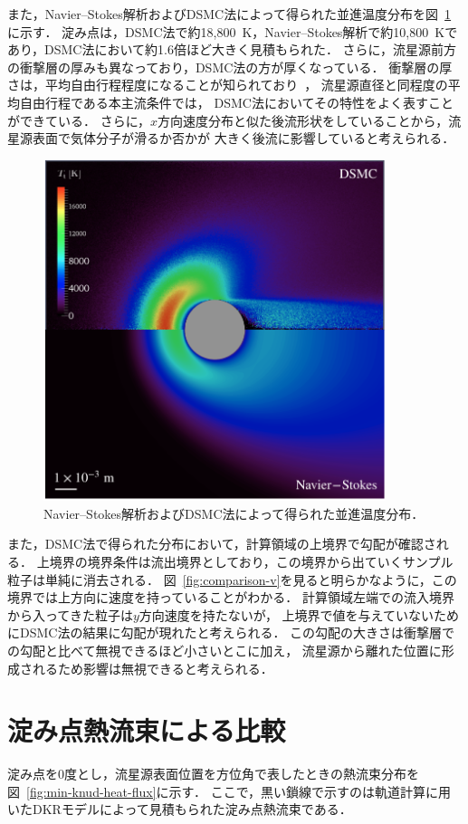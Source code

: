 また，Navier–Stokes解析およびDSMC法によって得られた並進温度分布を図~\ref{fig:comparison-tt}に示す．
淀み点は，DSMC法で約18,800~K，Navier–Stokes解析で約10,800~Kであり，DSMC法において約1.6倍ほど大きく見積もられた．
さらに，流星源前方の衝撃層の厚みも異なっており，DSMC法の方が厚くなっている．
衝撃層の厚さは，平均自由行程程度になることが知られており~\cite{maruzen圧縮性流体}，
流星源直径と同程度の平均自由行程である本主流条件では，
DSMC法においてその特性をよく表すことができている．
さらに，$x$方向速度分布と似た後流形状をしていることから，流星源表面で気体分子が滑るか否かが
大きく後流に影響していると考えられる．
\begin{figure}[H]
    \centering
    \includegraphics[width=10cm,clip]{fig/min_knud/comparison/tt-crop}
    \caption{Navier–Stokes解析およびDSMC法によって得られた並進温度分布．}
    \label{fig:comparison-tt}
\end{figure}

また，DSMC法で得られた分布において，計算領域の上境界で勾配が確認される．
上境界の境界条件は流出境界としており，この境界から出ていくサンプル粒子は単純に消去される．
図~\ref{fig:comparison-v}を見ると明らかなように，この境界では上方向に速度を持っていることがわかる．
計算領域左端での流入境界から入ってきた粒子は$y$方向速度を持たないが，
上境界で値を与えていないためにDSMC法の結果に勾配が現れたと考えられる．
この勾配の大きさは衝撃層での勾配と比べて無視できるほど小さいとこに加え，
流星源から離れた位置に形成されるため影響は無視できると考えられる．

\newpage
\section{淀み点熱流束による比較}
淀み点を0度とし，流星源表面位置を方位角で表したときの熱流束分布を図~\ref{fig:min-knud-heat-flux}に示す．
ここで，黒い鎖線で示すのは軌道計算に用いたDKRモデルによって見積もられた淀み点熱流束である．

